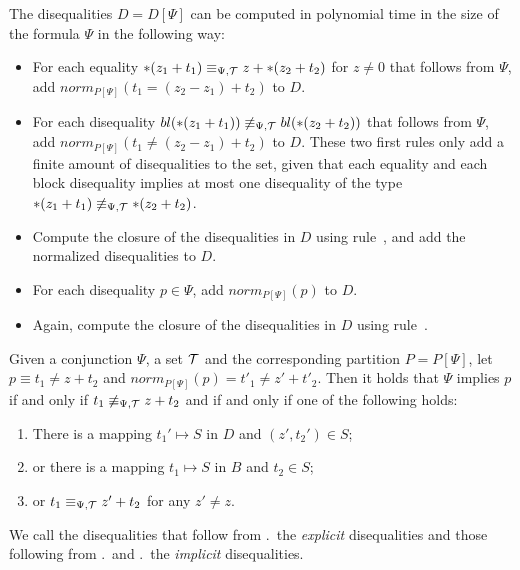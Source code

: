 The disequalities $D = D[\Psi]$ can be computed in polynomial time in the size of the formula $\Psi$ in the following way:

\begin{itemize}
    \item For each equality $*(z_1 + t_1) \equiv_{\Psi,\mathcal{T}} z + *(z_2 + t_2)$ for $z \neq 0$
          that follows from $\Psi$,
          add $norm_{P[\Psi]}(t_1 = (z_2 - z_1) + t_2)$ to $D$.
    \item For each disequality $bl(*(z_1 + t_1)) \not\equiv_{\Psi,\mathcal{T}} bl(*(z_2 + t_2))$ that follows from $\Psi$, add $norm_{P[\Psi]}(t_1 \neq (z_2 - z_1) + t_2)$ to $D$.
          These two first rules only add a finite amount of disequalities to the set, given that each equality and each block disequality implies at most one disequality of the type $*(z_1 + t_1) \not\equiv_{\Psi,\mathcal{T}} *(z_2 + t_2)$.
    \item Compute the closure of the disequalities in $D$ using rule~, and add the normalized disequalities to $D$.
    \item For each disequality $p \in \Psi$, add $norm_{P[\Psi]}(p)$ to $D$.
    \item Again, compute the closure of the disequalities in $D$ using rule~.
\end{itemize}

Given a conjunction $\Psi$, a set $\mathcal{T}$ and the corresponding partition $P = P[\Psi]$, let $p \equiv t_1 \neq z + t_2$ and $norm_{P[\Psi]}(p) = t'_1 \neq z' + t'_2$.
Then
it holds that $\Psi$ implies $p$ if and only if $t_1 \not\equiv_{\Psi,\mathcal{T}} z + t_2$ and if and only if one of the following holds:

\begin{enumerate}
    \item\label{item:diseqs} There is a mapping $t_1' \mapsto S$ in $D$ and $(z', t_2') \in S$;
    \item\label{item:bl-diseqs} or there is a mapping $t_1 \mapsto S$ in $B$ and $t_2 \in S$;
    \item\label{item:eqs} or $t_1 \equiv_{\Psi,\mathcal{T}} z' + t_2$ for any $z' \neq z$.
\end{enumerate}
We call the disequalities that follow from .\ the \emph{explicit} disequalities and those following from .\ and .\ the \emph{implicit} disequalities.
